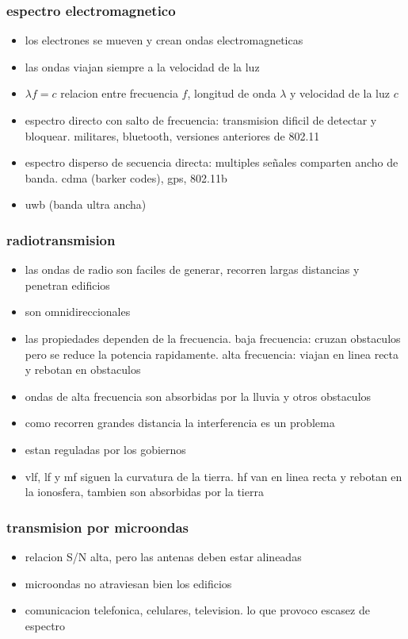 \documentclass[11pt]{article}
\begin{document}
\subsubsection{espectro electromagnetico}
\label{sec:org78a8530}
\begin{itemize}
\item los electrones se mueven y crean ondas electromagneticas
\item las ondas viajan siempre a la velocidad de la luz
\item \(\lambda f=c\) relacion entre frecuencia \(f\), longitud de onda \(\lambda\) y velocidad de la luz \(c\)
\item espectro directo con salto de frecuencia: transmision dificil de detectar y bloquear. militares, bluetooth, versiones anteriores de 802.11
\item espectro disperso de secuencia directa: multiples señales comparten ancho de banda. cdma (barker codes), gps, 802.11b
\item uwb (banda ultra ancha)
\end{itemize}
\subsubsection{radiotransmision}
\label{sec:org97ee0e9}
\begin{itemize}
\item las ondas de radio son faciles de generar, recorren largas distancias y penetran edificios
\item son omnidireccionales
\item las propiedades dependen de la frecuencia. baja frecuencia: cruzan obstaculos pero se reduce la potencia rapidamente. alta frecuencia: viajan en linea recta y rebotan en obstaculos
\item ondas de alta frecuencia son absorbidas por la lluvia y otros obstaculos
\item como recorren grandes distancia la interferencia es un problema
\item estan reguladas por los gobiernos
\item vlf, lf y mf siguen la curvatura de la tierra. hf van en linea recta y rebotan en la ionosfera, tambien son absorbidas por la tierra
\end{itemize}
\subsubsection{transmision por microondas}
\label{sec:org75850b8}
\begin{itemize}
\item relacion S/N alta, pero las antenas deben estar alineadas
\item microondas no atraviesan bien los edificios
\item comunicacion telefonica, celulares, television. lo que provoco escasez de espectro
\end{itemize}
\end{document}
